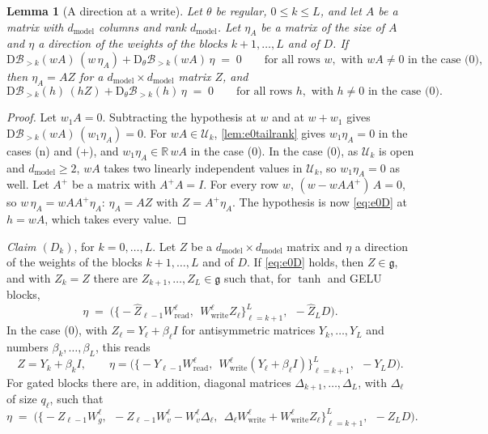 \documentclass[10pt]{article}
\newtheorem{lemma}[theorem]{Lemma}
\theoremstyle{definition}
\theoremstyle{remark}
\newcommand{\R}{\mathbb{R}}
\newcommand{\Wread}{W_{\mathrm{read}}}
\newcommand{\Wwrite}{W_{\mathrm{write}}}
\newcommand{\dm}{d_{\mathrm{model}}}
\newcommand{\Der}{\mathrm{D}}
\begin{document}
\begin{lemma}[A direction at a write]\label{lem:e0atwrite}
Let $\theta$ be regular, $0 \le k \le L$, and let $A$ be a matrix with $\dm$ columns and rank $\dm$. Let $\eta_A$ be a matrix of the size of $A$ and $\eta$ a direction of the weights of the blocks $k+1, \dots, L$ and of $D$. If
\[
\Der\mathcal B_{>k}(wA)\,(w\,\eta_A) + \Der_\theta\mathcal B_{>k}(wA)\,\eta \;=\; 0 \qquad\text{for all rows } w, \text{ with } wA \neq 0 \text{ in the case (0)},
\]
then $\eta_A = AZ$ for a $\dm\times\dm$ matrix $Z$, and
\begin{equation}\label{eq:e0D}
\Der\mathcal B_{>k}(h)\,(hZ) + \Der_\theta\mathcal B_{>k}(h)\,\eta \;=\; 0 \qquad\text{for all rows } h, \text{ with } h \neq 0 \text{ in the case (0)}.
\end{equation}
\end{lemma}

\begin{proof}
Let $w_1A = 0$. Subtracting the hypothesis at $w$ and at $w + w_1$ gives $\Der\mathcal B_{>k}(wA)\,(w_1\eta_A) = 0$. For $wA \in \mathcal U_k$, \cref{lem:e0tailrank} gives $w_1\eta_A = 0$ in the cases (n) and (+), and $w_1\eta_A \in \R\,wA$ in the case (0). In the case (0), as $\mathcal U_k$ is open and $\dm \ge 2$, $wA$ takes two linearly independent values in $\mathcal U_k$, so $w_1\eta_A = 0$ as well. Let $A^+$ be a matrix with $A^+A = I$. For every row $w$, $(w - wAA^+)\,A = 0$, so $w\,\eta_A = wAA^+\eta_A$: $\eta_A = AZ$ with $Z = A^+\eta_A$. The hypothesis is now \eqref{eq:e0D} at $h = wA$, which takes every value.
\end{proof}

\smallskip
\noindent\emph{Claim $(D_k)$}, for $k = 0, \dots, L$. Let $Z$ be a $\dm\times\dm$ matrix and $\eta$ a direction of the weights of the blocks $k+1, \dots, L$ and of $D$. If \eqref{eq:e0D} holds, then $Z \in \mathfrak g$, and with $Z_k = Z$ there are $Z_{k+1}, \dots, Z_L \in \mathfrak g$ such that, for $\tanh$ and GELU blocks,
\begin{equation}\label{eq:sbDconcl}
\eta \;=\; \Big(\big\{-\widehat Z_{\ell-1}\Wread^{\ell},\ \ \Wwrite^{\ell}Z_\ell\big\}_{\ell=k+1}^{L},\ \ -\widehat Z_LD\Big).
\end{equation}
In the case (0), with $Z_\ell = Y_\ell + \beta_\ell I$ for antisymmetric matrices $Y_k, \dots, Y_L$ and numbers $\beta_k, \dots, \beta_L$, this reads
\begin{equation}\label{eq:e0Dconcl}
Z = Y_k + \beta_k I, \qquad \eta = \Big(\big\{-Y_{\ell-1}\Wread^{\ell},\ \ \Wwrite^{\ell}(Y_\ell + \beta_\ell I)\big\}_{\ell=k+1}^{L},\ \ -Y_LD\Big).
\end{equation}
For gated blocks there are, in addition, diagonal matrices $\Delta_{k+1}, \dots, \Delta_L$, with $\Delta_\ell$ of size $q_\ell$, such that
\begin{equation}\label{eq:gtDconcl}
\eta \;=\; \Big(\big\{-Z_{\ell-1}W_g^{\ell},\ \ -Z_{\ell-1}W_v^{\ell} - W_v^{\ell}\Delta_\ell,\ \ \Delta_\ell\Wwrite^{\ell} + \Wwrite^{\ell}Z_\ell\big\}_{\ell=k+1}^{L},\ \ -Z_LD\Big).
\end{equation}
\end{document}
